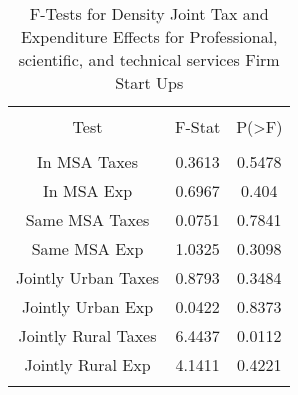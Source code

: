 
\begin{table}[!htbp] \centering 
  \caption{F-Tests for Density Joint Tax and Expenditure Effects for Professional, scientific, and technical services Firm Start Ups} 
  \label{54Ftests} 
\begin{tabular}{@{\extracolsep{5pt}} ccc} 
\\[-1.8ex]\hline 
\hline \\[-1.8ex] 
Test & F-Stat & P(\textgreater F) \\ 
\hline \\[-1.8ex] 
In MSA Taxes & 0.3613 & 0.5478 \\ 
In MSA Exp & 0.6967 & 0.404 \\ 
Same MSA Taxes & 0.0751 & 0.7841 \\ 
Same MSA Exp & 1.0325 & 0.3098 \\ 
Jointly Urban Taxes & 0.8793 & 0.3484 \\ 
Jointly Urban Exp & 0.0422 & 0.8373 \\ 
Jointly Rural Taxes & 6.4437 & 0.0112 \\ 
Jointly Rural Exp & 4.1411 & 0.4221 \\ 
\hline \\[-1.8ex] 
\end{tabular} 
\end{table} 
